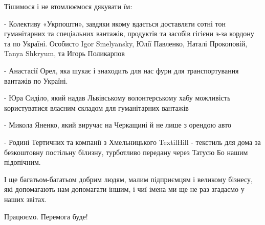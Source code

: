 Тішимося і не втомлюємося дякувати їм: 

-  Колективу «Укрпошти», завдяки якому вдається доставляти сотні тон
гуманітарних та спеціальних вантажів, продуктів та засобів гігієни з-за кордону
та по Україні.  Особисто Igor Smelyansky, Юлії Павленко, Наталі Прокоповій,
Tanya Shkryum, та Игорь Поликарпов

-  Анастасії Орел, яка шукає і знаходить для нас фури для транспортування
вантажів по Україні.

-  Юра Сиділо, який надав Львівському волонтерському хабу можливість
користуватися власним складом для гуманітарних вантажів

-  Микола Яненко, який виручає на Черкащині й не лише з орендою авто

-  Родині Тертичних та компанії з Хмельницького TextilHill - текстиль для дома
за безкоштовну постільну білизну, турботливо передану через Татусю Бо нашим
підопічним. 

І ще багатьом-багатьом добрим людям, малим підприємцям і великому бізнесу, які
допомагають нам допомагати іншим, і чиї імена ми ще не раз згадаємо у наших
звітах. 

Працюємо. Перемога буде!
